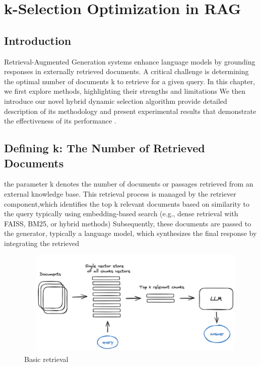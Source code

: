 \chapter{k-Selection Optimization in RAG }
\pagestyle{fancy}
\pagestyle{fancy}\chead{} \pagestyle{fancy}\rhead{} 
\pagestyle{fancy}\cfoot{} \pagestyle{fancy}\rfoot{\thepage}
\section{Introduction}
Retrieval-Augmented Generation systems enhance language models by grounding responses in externally retrieved documents. A critical challenge is determining the optimal number of documents k to retrieve for a given query. In this chapter, we first explore methods, highlighting their strengths and limitations We then introduce our novel hybrid dynamic selection algorithm provide detailed description of its methodology and present experimental results that demonstrate the effectiveness of its performance . 

\section{Defining k: The Number of Retrieved Documents}
the parameter k denotes the number of documents or passages retrieved from an external knowledge base. This retrieval process is managed by the retriever component\citep{pareto2024rag},which identifies the top k relevant documents based on similarity to the query typically using embedding-based search\citep{Rossi_2024} (e.g., dense retrieval with FAISS, BM25, or hybrid methods) Subsequently, these documents are passed to the generator, typically a language model, which synthesizes the final response by integrating the retrieved 
\begin{figure}[h]
	\centering
	\includegraphics[width=0.9\linewidth]{Figures/topk.png}
	\caption{Basic retrieval}
	\label{rag_retrival.png}
	
\end{figure}

